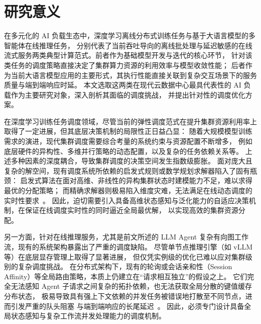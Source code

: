 \section{研究意义}\label{sec:research-significance}
在多元化的 AI 负载生态中，深度学习离线分布式训练任务与基于大语言模型的多智能体在线推理任务，
分别代表了当前吞吐导向的离线批处理与延迟敏感的在线流式服务两类典型计算范式。前者作为基础模型开发与迭代的核心环节，
针对该类任务的调度策略直接决定了集群算力资源的利用效率与模型收敛性能；
后者作为当前大语言模型应用的主要形式，其执行性能直接关联到复杂交互场景下的服务质量与端到端响应时延。
本文选取这两类在现代云数据中心最具代表性的 AI 负载作为主要研究对象，深入剖析其面临的调度挑战，
并提出针对性的调度优化方案。

在深度学习训练任务调度领域，尽管当前的弹性调度范式在提升集群资源利用率上取得了一定进展，但其底层决策机制的局限性正日益凸显：
随着大规模模型训练需求的演进，现代集群调度需要综合考量的系统约束与资源配置不断增多，
例如底层硬件的异构性、多维并行策略的动态配置，以及复杂的任务依赖关系等。
上述多种因素的深度耦合，导致集群调度的决策空间发生指数级膨胀。
面对庞大且复杂的解空间，现有调度系统所依赖的启发式规则或数学规划求解器陷入了固有瓶颈：
启发式算法在面对高维、非线性的异构集群状态时建模能力不足，难以求得最优的分配策略；
而精确求解器则极易陷入维度灾难，无法满足在线动态调度的实时性要求~\cite{qiao2021pollux,chen2023deepboot}。
因此，迫切需要引入具备高维状态感知与泛化能力的自适应决策机制，在保证在线调度实时性的同时逼近全局最优解，
以实现高效的集群资源分配。


另一方面，针对在线推理服务，尤其是前文所述的 LLM Agent 复杂有向图工作流，现有的系统架构暴露出了严重的调度缺陷。
尽管单节点推理引擎（如 vLLM~\cite{kwon2023efficient} 等）在底层显存管理上取得了显著进展，
但仅凭实例级的优化已难以应对集群级别的复杂调度挑战。
在分布式架构下，现有的轮询或会话亲和性（Session Affinity）等全局路由策略，本质上仍建立在“请求相互独立”的假设之上。
它们完全无法感知 Agent 子请求之间复杂的拓扑依赖，也无法获取全局分散的键值缓存分布状态，
极易导致具有强上下文依赖的并发任务被错误地打散至不同节点，进而引发严重的队头阻塞
与端到端响应的长尾延迟~\cite{zheng2024sglang,lin2024parrot}。
因此，必须专门设计具备全局状态感知与复杂工作流并发处理能力的调度机制。

